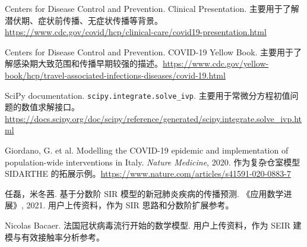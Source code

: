 \documentclass[UTF8,12pt,a4paper]{ctexart}
\begin{document}
\noindent [3] Centers for Disease Control and Prevention. Clinical Presentation. 主要用于了解潜伏期、症状前传播、无症状传播等背景。\url{https://www.cdc.gov/covid/hcp/clinical-care/covid19-presentation.html}

\noindent [4] Centers for Disease Control and Prevention. COVID-19 Yellow Book. 主要用于了解感染期大致范围和传播早期较强的描述。\url{https://www.cdc.gov/yellow-book/hcp/travel-associated-infections-diseases/covid-19.html}

\noindent [5] SciPy documentation. \texttt{scipy.integrate.solve\_ivp}. 主要用于常微分方程初值问题的数值求解接口。\url{https://docs.scipy.org/doc/scipy/reference/generated/scipy.integrate.solve_ivp.html}

\noindent [6] Giordano, G. et al. Modelling the COVID-19 epidemic and implementation of population-wide interventions in Italy. \textit{Nature Medicine}, 2020. 作为复杂仓室模型 SIDARTHE 的拓展示例。\url{https://www.nature.com/articles/s41591-020-0883-7}

\noindent [7] 任磊，米冬茜. 基于分数阶 SIR 模型的新冠肺炎疾病的传播预测. 《应用数学进展》, 2021. 用户上传资料，作为 SIR 思路和分数阶扩展参考。

\noindent [8] Nicolas Bacaer. 法国冠状病毒流行开始的数学模型. 用户上传资料，作为 SEIR 建模与有效接触率分析参考。
\end{document}
